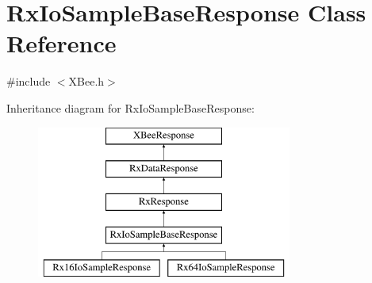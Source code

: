 \hypertarget{classRxIoSampleBaseResponse}{\section{\-Rx\-Io\-Sample\-Base\-Response \-Class \-Reference}
\label{classRxIoSampleBaseResponse}
}


{\ttfamily \#include $<$\-X\-Bee.\-h$>$}

\-Inheritance diagram for \-Rx\-Io\-Sample\-Base\-Response\-:\begin{figure}[H]
\begin{center}
\leavevmode
\includegraphics[height=5.000000cm]{classRxIoSampleBaseResponse}
\end{center}
\end{figure}
